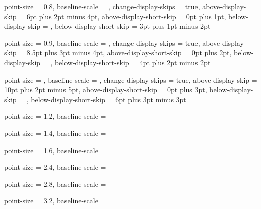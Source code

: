   {
    point-size               = \ScaleToNearestTenthPoint {\NormalPointSize} {0.8},
    baseline-scale           = \NormalBaselineScale,
    change-display-skips     = true,
    above-display-skip       = 6pt plus 2pt minus 4pt,
    above-display-short-skip = 0pt plus 1pt,
    below-display-skip       = ,
    below-display-short-skip = 3pt plus 1pt minus 2pt
  }

  {
    point-size               = \ScaleToNearestTenthPoint {\NormalPointSize} {0.9},
    baseline-scale           = \NormalBaselineScale,
    change-display-skips     = true,
    above-display-skip       = 8.5pt plus 3pt minus 4pt,
    above-display-short-skip = 0pt plus 2pt,
    below-display-skip       = ,
    below-display-short-skip = 4pt plus 2pt minus 2pt
  }

  {
    point-size               = \NormalPointSize,
    baseline-scale           = \NormalBaselineScale,
    change-display-skips     = true,
    above-display-skip       = 10pt plus 2pt minus 5pt,
    above-display-short-skip = 0pt plus 3pt,
    below-display-skip       = ,
    below-display-short-skip = 6pt plus 3pt minus 3pt
  }

  {
    point-size     = \ScaleToNearestTenthPoint {\NormalPointSize} {1.2},
    baseline-scale = \NormalBaselineScale
  }

  {
    point-size     = \ScaleToNearestTenthPoint {\NormalPointSize} {1.4},
    baseline-scale = \NormalBaselineScale
  }

  {
    point-size     = \ScaleToNearestTenthPoint {\NormalPointSize} {1.6},
    baseline-scale = \NormalBaselineScale
  }

  {
    point-size     = \ScaleToNearestTenthPoint {\NormalPointSize} {2.4},
    baseline-scale = \NormalBaselineScale
  }

  {
    point-size     = \ScaleToNearestTenthPoint {\NormalPointSize} {2.8},
    baseline-scale = \NormalBaselineScale
  }

  {
    point-size     = \ScaleToNearestTenthPoint {\NormalPointSize} {3.2},
    baseline-scale = \NormalBaselineScale
  }




%

